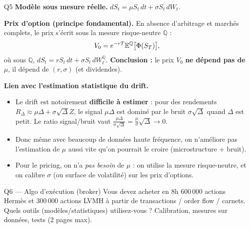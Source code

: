 \begin{solutionbox}{Q5}
\textbf{Modèle sous mesure réelle.} $dS_t=\mu S_t\,dt+\sigma S_t\,dW_t$.

\medskip
\textbf{Prix d'option (principe fondamental).} En absence d'arbitrage et marchés complets, le prix s'écrit sous la mesure risque-neutre $\mathbb{Q}$ :
\[
V_0 = e^{-rT}\mathbb{E}^{\mathbb{Q}}\big[\Phi(S_T)\big],
\]
où sous $\mathbb{Q}$, $dS_t=r S_t\,dt+\sigma S_t\,dW_t^{\mathbb{Q}}$.
\textbf{Conclusion :} le prix $V_0$ \textbf{ne dépend pas de $\mu$}, il dépend de $(r,\sigma)$ (et dividendes).

\medskip
\textbf{Lien avec l'estimation statistique du drift.}
\begin{itemize}[leftmargin=*]
  \item Le drift est notoirement \textbf{difficile à estimer} : pour des rendements $R_{\Delta}\approx \mu\Delta+\sigma\sqrt{\Delta}Z$, le signal $\mu\Delta$ est dominé par le bruit $\sigma\sqrt{\Delta}$ quand $\Delta$ est petit. Le ratio signal/bruit vaut $\frac{\mu\Delta}{\sigma\sqrt{\Delta}}=\frac{\mu}{\sigma}\sqrt{\Delta}\to 0$.
  \item Donc même avec beaucoup de données haute fréquence, on n'améliore pas l'estimation de $\mu$ aussi vite qu'on pourrait le croire (microstructure + bruit).
  \item Pour le pricing, on n'a \emph{pas besoin} de $\mu$ : on utilise la mesure risque-neutre, et on calibre $\sigma$ (ou surface de volatilité) sur les prix d'options.
\end{itemize}
\end{solutionbox}

\begin{questionbox}{Q6 --- Algo d'exécution (broker)}
Vous devez acheter en 8h 600\,000 actions Herm\`es et 300\,000 actions LVMH \`a partir de transactions / order flow / carnets. Quels outils (modèles/statistiques) utilisez-vous ? Calibration, mesures sur données, tests (2 pages max).
\end{questionbox}

